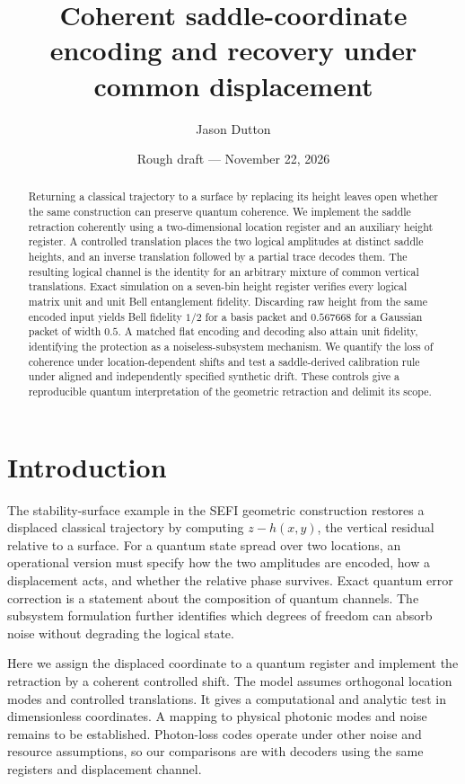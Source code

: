 \documentclass[aip,adv,reprint,floatfix]{revtex4-2}
\begin{document}
\title{Coherent saddle-coordinate encoding and recovery under common displacement}
\author{Jason Dutton}
\date{Rough draft --- November 22, 2026}
\begin{abstract}
Returning a classical trajectory to a surface by replacing its height leaves open whether the same construction can preserve quantum coherence. We implement the saddle retraction coherently using a two-dimensional location register and an auxiliary height register. A controlled translation places the two logical amplitudes at distinct saddle heights, and an inverse translation followed by a partial trace decodes them. The resulting logical channel is the identity for an arbitrary mixture of common vertical translations. Exact simulation on a seven-bin height register verifies every logical matrix unit and unit Bell entanglement fidelity. Discarding raw height from the same encoded input yields Bell fidelity \(1/2\) for a basis packet and \(0.567668\) for a Gaussian packet of width \(0.5\). A matched flat encoding and decoding also attain unit fidelity, identifying the protection as a noiseless-subsystem mechanism. We quantify the loss of coherence under location-dependent shifts and test a saddle-derived calibration rule under aligned and independently specified synthetic drift. These controls give a reproducible quantum interpretation of the geometric retraction and delimit its scope.
\end{abstract}
\maketitle

\section{Introduction}

The stability-surface example in the SEFI geometric construction restores a displaced classical trajectory by computing \(z-h(x,y)\), the vertical residual relative to a surface.\cite{Dutton} For a quantum state spread over two locations, an operational version must specify how the two amplitudes are encoded, how a displacement acts, and whether the relative phase survives. Exact quantum error correction is a statement about the composition of quantum channels.\cite{KL} The subsystem formulation further identifies which degrees of freedom can absorb noise without degrading the logical state.\cite{KLV}

Here we assign the displaced coordinate to a quantum register and implement the retraction by a coherent controlled shift. The model assumes orthogonal location modes and controlled translations. It gives a computational and analytic test in dimensionless coordinates. A mapping to physical photonic modes and noise remains to be established. Photon-loss codes operate under other noise and resource assumptions,\cite{Albert} so our comparisons are with decoders using the same registers and displacement channel.
\end{document}
